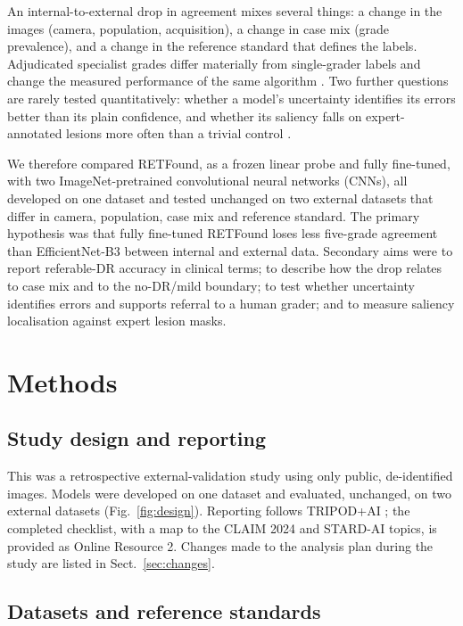 \documentclass[pdflatex,sn-basic,Numbered]{sn-jnl}
\begin{document}
An internal-to-external drop in agreement mixes several things: a change in the images (camera, population, acquisition), a change in case mix (grade prevalence), and a change in the reference standard that defines the labels. Adjudicated specialist grades differ materially from single-grader labels and change the measured performance of the same algorithm \cite{krause2018}. Two further questions are rarely tested quantitatively: whether a model's uncertainty identifies its errors better than its plain confidence, and whether its saliency falls on expert-annotated lesions more often than a trivial control \cite{mahapadi2025,alizadeh2024}.

We therefore compared RETFound, as a frozen linear probe and fully fine-tuned, with two ImageNet-pretrained convolutional neural networks (CNNs), all developed on one dataset and tested unchanged on two external datasets that differ in camera, population, case mix and reference standard. The primary hypothesis was that fully fine-tuned RETFound loses less five-grade agreement than EfficientNet-B3 between internal and external data. Secondary aims were to report referable-DR accuracy in clinical terms; to describe how the drop relates to case mix and to the no-DR/mild boundary; to test whether uncertainty identifies errors and supports referral to a human grader; and to measure saliency localisation against expert lesion masks.

\section{Methods}\label{sec:methods}

\subsection{Study design and reporting}

This was a retrospective external-validation study using only public, de-identified images. Models were developed on one dataset and evaluated, unchanged, on two external datasets (Fig.~\ref{fig:design}). Reporting follows TRIPOD+AI \cite{tripodai2024}; the completed checklist, with a map to the CLAIM 2024 \cite{claim2024} and STARD-AI \cite{stardai2025} topics, is provided as Online Resource 2. Changes made to the analysis plan during the study are listed in Sect.~\ref{sec:changes}.

\subsection{Datasets and reference standards}\label{sec:data}
\end{document}
